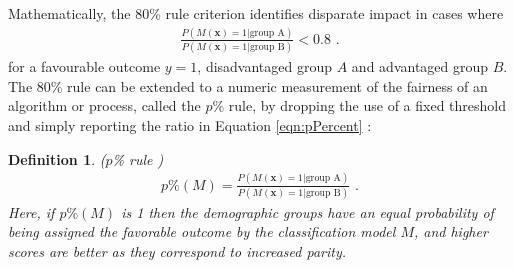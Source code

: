 \documentclass[11pt,dvipdfm]{article}
\newtheorem{dfn}[theorem]{Definition}
\begin{document}
Mathematically, the 80\% rule criterion identifies disparate impact in cases where
\begin{align}
\frac{P(M(\mathbf{x}) = 1| \mbox{group A})}{P(M(\mathbf{x}) = 1| \mbox{group B})} < 0.8 \mbox{ .} \label{eqn:pPercent}
\end{align}
for a favourable outcome $y=1$, %
disadvantaged group $A$ and advantaged group $B$.  %
The 80\% rule can be extended to a numeric measurement of the fairness of an algorithm or process, called the $p$\% rule, by dropping the use of a fixed threshold and simply reporting the ratio in Equation \ref{eqn:pPercent} \cite{zafar2015fairness}:
\begin{dfn} ($p$\% rule \cite{zafar2015fairness})
\begin{align}
    p\%(M) = \frac{P(M(\mathbf{x}) = 1| \mbox{group A})}{P(M(\mathbf{x}) = 1| \mbox{group B})} \mbox{ .}
\end{align}
Here, if $p\%(M)$ is 1 then the demographic groups have an equal probability of being assigned the favorable outcome by the classification model $M$, and higher scores are better as they correspond to increased parity.
\end{dfn}
\end{document}
